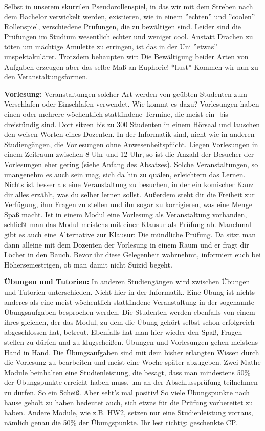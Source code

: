 \spaltenanfang
Selbst in unserem skurrilen Pseudorollenspiel, in das wir mit dem Streben nach dem Bachelor verwickelt werden, existieren, wie in einem ''echten'' und ''coolen'' Rollenspiel, verschiedene Prüfungen, die zu bewältigen sind. Leider sind die Prüfungen im Studium wesentlich echter und weniger cool. Anstatt Drachen zu töten um mächtige Amulette zu erringen, ist das in der Uni ''etwas'' unspektakulärer. Trotzdem behaupten wir: Die Bewältigung beider Arten von Aufgaben erzeugen aber das selbe Maß an Euphorie! *hust* 
Kommen wir nun zu den Veranstaltungsformen.

\textbf{Vorlesung: } Veranstaltungen solcher Art werden von geübten Studenten
zum Verschlafen oder Einschlafen verwendet. Wie kommt es dazu? Vorlesungen
haben einen oder mehrere wöchentlich stattfindene Termine, die meist ein- bis
dreistündig sind. Dort sitzen bis zu 300 Studenten in einem Hörsaal und
lauschen den weisen Worten eines Dozenten. In der Informatik sind, nicht wie in
anderen Studiengängen, die Vorlesungen ohne Anwesenheitspflicht. Liegen
Vorlesungen in einem Zeitraum zwischen 8 Uhr und 12 Uhr, so ist die Anzahl der
Besucher der Vorlesungen eher gering (siehe Anfang des Absatzes). Solche
Veranstaltungen, so unangenehm es auch sein mag, sich da hin zu quälen,
erleichtern das Lernen. Nichts ist besser als eine Veranstaltung zu besuchen,
in der ein komischer Kauz dir alles erzählt, was du selber lernen sollst.
Außerdem steht dir die Freiheit zur Verfügung, ihm Fragen zu stellen und ihn
sogar zu korrigieren, was eine Menge Spaß macht. Ist in einem Modul eine
Vorlesung als Veranstaltung vorhanden, schließt man das Modul meistens mit
einer Klausur als Prüfung ab. Manchmal gibt es auch eine Alternative zur
Klausur: Die mündliche Prüfung. Da sitzt man dann alleine mit dem Dozenten der
Vorlesung in einem Raum und er fragt dir Löcher in den Bauch. Bevor ihr diese
Gelegenheit wahrnehmt, informiert euch bei Höhersemestrigen, ob man damit nicht
Suizid begeht.

\textbf{Übungen und Tutorien: }
In anderen Studiengängen wird zwischen Übungen und Tutorien unterschieden. Nicht hier in der Informatik. Eine Übung ist nichts anderes als eine meist wöchentlich stattfindene Veranstaltung in der sogenannte Übungsaufgaben besprochen werden. Die Studenten werden ebenfalls von einem ihres gleichen, der das Modul, zu dem die Übung gehört selbst schon erfolgreich abgeschlossen hat, betreut. Ebenfalls hat man hier wieder den Spaß, Fragen stellen zu dürfen und zu klugscheißen. Übungen und Vorlesungen gehen meistens Hand in Hand. Die Übungsaufgaben sind mit dem bisher erlangten Wissen durch die Vorlesung zu bearbeiten und meist eine Woche später abzugeben. Zwei Mathe Module beinhalten eine Studienleistung, die besagt, dass man mindestens 50\% der Übungspunkte erreicht haben muss, um an der Abschlussprüfung teilnehmen zu dürfen. So ein Scheiß. Aber seht's mal positiv! So viele Übungspunkte nach hause geholt zu haben bedeutet auch, sich etwas für die Prüfung vorbereitet zu haben. Andere Module, wie z.B. HW2, setzen nur eine Studienleistung vorraus, nämlich genau die 50\% der Übungspunkte. Ihr lest richtig: geschenkte CP.

